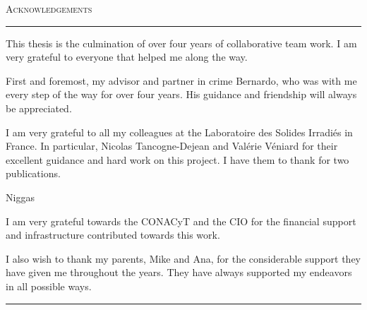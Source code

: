 \null
\vfill

{\LARGE{\scshape Acknowledgements}}

\noindent\rule[2pt]{\textwidth}{0.5pt}

This thesis is the culmination of over four years of collaborative team work. I
am very grateful to everyone that helped me along the way.

First and foremost, my advisor and partner in crime Bernardo, who was with me
every step of the way for over four years. His guidance and friendship will
always be appreciated.

I am very grateful to all my colleagues at the Laboratoire des Solides
Irradi\'es in France. In particular, Nicolas Tancogne-Dejean and Val\'erie
V\'eniard for their excellent guidance and hard work on this project. I have
them to thank for two publications.

Niggas

I am very grateful towards the CONACyT and the CIO for the financial support and
infrastructure contributed towards this work.

I also wish to thank my parents, Mike and Ana, for the considerable support they
have given me throughout the years. They have always supported my endeavors in
all possible ways.

\noindent\rule[2pt]{\textwidth}{0.5pt}

\vfill

\cleardoublepage
